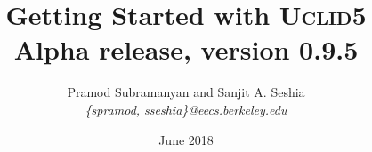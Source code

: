 \documentclass[oneside]{scrbook}
\newcommand{\uclid}{{\textsc{Uclid5}}\xspace}
\begin{document}
\title{Getting Started with {\uclid}\\Alpha release, version 0.9.5}
\author{Pramod Subramanyan and Sanjit A. Seshia \\
        \textit{\{spramod, sseshia\}@eecs.berkeley.edu}}
\date{June 2018}
\maketitle

\tableofcontents






\end{document}

